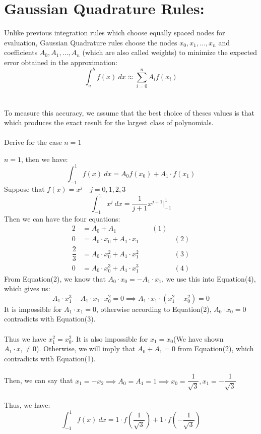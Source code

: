 \documentclass [9 pt]{article}
\theoremstyle{definition}
\begin{document}
\section*{Gaussian Quadrature Rules:}
Unlike previous integration rules which choose equally spaced nodes for evaluation, Gaussian Quadrature rules choose the nodes $x_0, x_1, \ldots, x_n$ and coefficients $A_0, A_1, \ldots, A_n$ (which are also called weights) to minimize the expected error obtained in the approximation:
$$ \int_{a}^{b} f(x)\ dx \approx \sum_{i = 0}^{n} A_i f(x_i) $$\\
\\
To measure this accuracy, we assume that the best choice of theses values is that which produces the exact result for the largest class of polynomials.\\
\\
Derive for the case  $n = 1$
\begin{mdframed}
	$n = 1$, then we have:
	$$ \int_{-1}^1 f(x)\ dx = A_0 f(x_0) + A_1\cdot f(x_1) $$
	Suppose that $f(x) = x^j \quad j = 0, 1, 2, 3$
	$$ \int_{-1}^{1} x^j\ dx = \dfrac{1}{j + 1} x^{j + 1}\bigg|^1_{-1} $$
	Then we can have the four equations:
	\begin{align*}
		2 &= A_0 + A_1 \quad\quad\quad\quad\quad (1)\\
		0 &= A_0\cdot x_0 + A_1 \cdot x_1 \quad\quad\quad\quad\quad  (2)\\
		\dfrac{2}{3} &= A_0 \cdot x_0^2 + A_1 \cdot x_1^2 \quad\quad\quad\quad\quad  (3)\\
		0 &= A_0\cdot x_0^3 + A_1 \cdot x_1^3 \quad\quad\quad\quad\quad  (4)
	\end{align*}
	From Equation(2), we know that $A_0\cdot x_0 = - A_1 \cdot x_1$, we use this into Equation(4), which gives us:
	$$ A_1 \cdot x_1^3 - A_1 \cdot x_1 \cdot x_0^2 = 0 \implies A_1\cdot x_1 \cdot (x_1^2 - x_0^2) = 0 $$
	It is impossible for $A_1 \cdot x_1 = 0$, otherwise according to Equation(2), $A_0 \cdot x_0 = 0$ contradicts with Equation(3).\\
	\\
	Thus we have $x_1^2 = x_0^2$. It is also impossible for $x_1 = x_0 $(We have shown $A_1 \cdot x_1 \neq 0$). Otherwise, we will imply that $A_0 + A_1 = 0 $ from Equation(2), which contradicts with Equation(1).\\
	\\
	Then, we can say that $x_1 = - x_2 \implies A_0 = A_1  = 1 \implies x_0 = \dfrac{1}{\sqrt{3}}, x_1 = - \dfrac{1}{\sqrt{3}}$\\
	\\
	Thus, we have:
	$$ \int_{-1}^1 f(x)\ dx = 1 \cdot f(\dfrac{1}{\sqrt{3}}) + 1\cdot f( - \dfrac{1}{\sqrt{3}}) $$

\end{mdframed}
\end{document}

